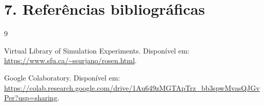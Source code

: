 \documentclass{article}
\begin{document}

\section*{7. Referências bibliográficas}
\begin{thebibliography}{9}

Virtual Library of Simulation Experiments. Disponível em: 
\url{https://www.sfu.ca/~ssurjano/rosen.html}.

Google Colaboratory. Disponível em:
\url{https://colab.research.google.com/drive/1Au649zMGTApTrz_bb3spwMvasQJGvPer?usp=sharing}.

\end{thebibliography}
\end{document}
